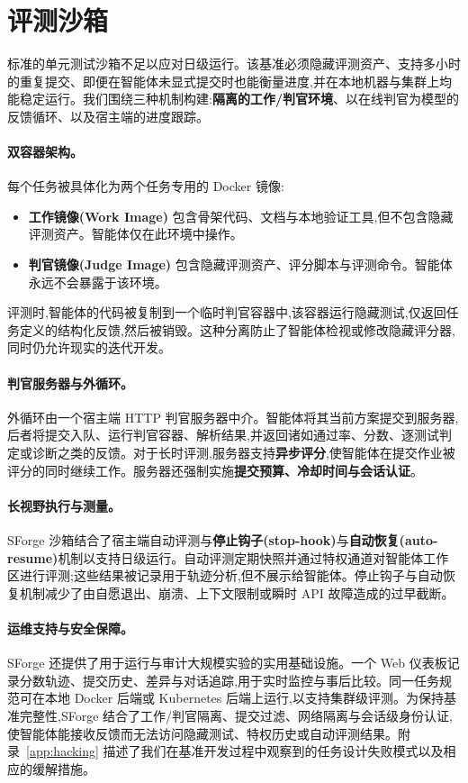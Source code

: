 \section{评测沙箱}
\label{app:harness}

标准的单元测试沙箱不足以应对日级运行。该基准必须隐藏评测资产、支持多小时的重复提交、即便在智能体未显式提交时也能衡量进度,并在本地机器与集群上均能稳定运行。我们围绕三种机制构建:\textbf{隔离的工作/判官环境}、以在线判官为模型的反馈循环、以及宿主端的进度跟踪。

\paragraph{双容器架构。} 每个任务被具体化为两个任务专用的 Docker 镜像:
\begin{itemize}
    \item \textbf{工作镜像(Work Image)} 包含骨架代码、文档与本地验证工具,但不包含隐藏评测资产。智能体仅在此环境中操作。
    \item \textbf{判官镜像(Judge Image)} 包含隐藏评测资产、评分脚本与评测命令。智能体永远不会暴露于该环境。
\end{itemize}

评测时,智能体的代码被复制到一个临时判官容器中,该容器运行隐藏测试,仅返回任务定义的结构化反馈,然后被销毁。这种分离防止了智能体检视或修改隐藏评分器,同时仍允许现实的迭代开发。

\paragraph{判官服务器与外循环。} 外循环由一个宿主端 HTTP 判官服务器中介。智能体将其当前方案提交到服务器,后者将提交入队、运行判官容器、解析结果,并返回诸如通过率、分数、逐测试判定或诊断之类的反馈。对于长时评测,服务器支持\textbf{异步评分},使智能体在提交作业被评分的同时继续工作。服务器还强制实施\textbf{提交预算、冷却时间与会话认证}。

\paragraph{长视野执行与测量。} SForge 沙箱结合了宿主端自动评测与\textbf{停止钩子(stop-hook)}与\textbf{自动恢复(auto-resume)}机制以支持日级运行。自动评测定期快照并通过特权通道对智能体工作区进行评测;这些结果被记录用于轨迹分析,但不展示给智能体。停止钩子与自动恢复机制减少了由自愿退出、崩溃、上下文限制或瞬时 API 故障造成的过早截断。

\paragraph{运维支持与安全保障。} SForge 还提供了用于运行与审计大规模实验的实用基础设施。一个 Web 仪表板记录分数轨迹、提交历史、差异与对话追踪,用于实时监控与事后比较。同一任务规范可在本地 Docker 后端或 Kubernetes 后端上运行,以支持集群级评测。为保持基准完整性,SForge 结合了工作/判官隔离、提交过滤、网络隔离与会话级身份认证,使智能体能接收反馈而无法访问隐藏测试、特权历史或自动评测结果。附录~\ref{app:hacking} 描述了我们在基准开发过程中观察到的任务设计失败模式以及相应的缓解措施。

